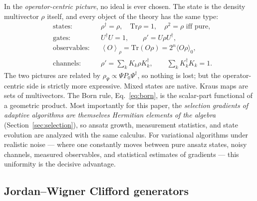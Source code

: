 \documentclass[11pt]{article}
\newcommand{\Tr}{\mathrm{Tr}}
\newcommand{\expval}[1]{\left\langle #1 \right\rangle}
\begin{document}
In the \emph{operator-centric picture}, no ideal is ever chosen.  The state is the density multivector $\rho$ itself, and every object of the theory has the same type:
\begin{align}
    &\text{states:} && \rho^\dagger=\rho,\quad \Tr\rho=1,\quad \rho^2=\rho \text{ iff pure},\\
    &\text{gates:} && U^\dagger U=1,\qquad \rho' = U\rho U^\dagger,\\
    &\text{observables:} && \expval{O}_\rho = \Tr(O\rho)=2^n\langle O\rho\rangle_0,\label{eq:born}\\
    &\text{channels:} && \rho' = \textstyle\sum_k K_k\rho K_k^\dagger,\qquad \sum_k K_k^\dagger K_k = 1 .
\end{align}
The two pictures are related by $\rho_\Psi\propto\Psi P_0\Psi^\dagger$, so nothing is lost; but the operator-centric side is strictly more expressive.  Mixed states are native.  Kraus maps are sets of multivectors.  The Born rule, Eq.~\eqref{eq:born}, is the scalar-part functional of a geometric product.  Most importantly for this paper, the \emph{selection gradients of adaptive algorithms are themselves Hermitian elements of the algebra} (Section~\ref{sec:selection}), so ansatz growth, measurement statistics, and state evolution are analyzed with the same calculus.  For variational algorithms under realistic noise --- where one constantly moves between pure ansatz states, noisy channels, measured observables, and statistical estimates of gradients --- this uniformity is the decisive advantage.

\subsection{Jordan--Wigner Clifford generators}
\end{document}
